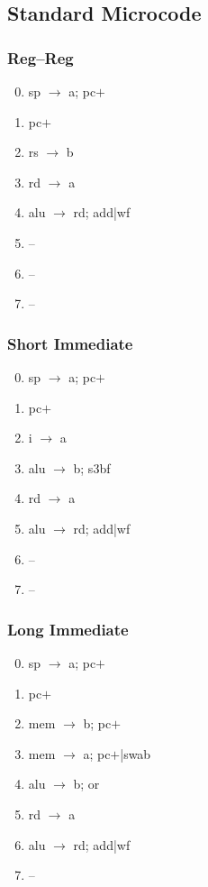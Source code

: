 \documentclass[11pt]{book}
\begin{document}
\subsection*{Standard Microcode}
\begin{multicols}{3}\ttfamily\selectfont\small
  \subsubsection*{Reg--Reg}
  \begin{enumerate}\setcounter{enumi}{-1}
  \item sp \(\rightarrow\) a; pc\(+\)
  \item pc\(+\)
  \item rs \(\rightarrow\) b
  \item rd \(\rightarrow\) a
  \item alu \(\rightarrow\) rd; add|wf
  \item --
  \item --
  \item --
  \end{enumerate}
  \columnbreak
  \subsubsection*{Short Immediate}
  \begin{enumerate}\setcounter{enumi}{-1}
  \item sp \(\rightarrow\) a; pc\(+\)
  \item pc\(+\)
  \item i \(\rightarrow\) a
  \item alu \(\rightarrow\) b; s3bf
  \item rd \(\rightarrow\) a
  \item alu \(\rightarrow\) rd; add|wf
  \item --
  \item --
  \end{enumerate}
  \columnbreak
  \subsubsection*{Long Immediate}
  \begin{enumerate}\setcounter{enumi}{-1}
  \item sp \(\rightarrow\) a; pc\(+\)
  \item pc\(+\)
  \item mem \(\rightarrow\) b; pc\(+\)
  \item mem \(\rightarrow\) a; pc\(+\)|swab
  \item alu \(\rightarrow\) b; or
  \item rd \(\rightarrow\) a
  \item alu \(\rightarrow\) rd; add|wf
  \item --
  \end{enumerate}
\end{multicols}
\end{document}
